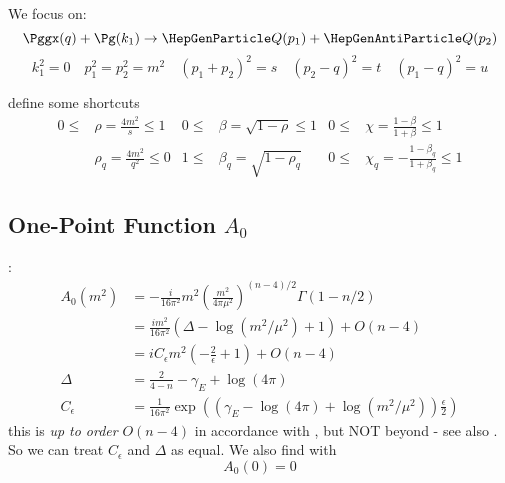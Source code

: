 We focus on:
\begin{equation}
\Pggx(q) + \Pg(k_1) \rightarrow \PQ(p_1)+\PaQ(p_2)
\end{equation}
\begin{equation}
k_1^2 = 0 \quad p_1^2 = p_2^2 = m^2 \quad (p_1+p_2)^2=s\quad (p_2-q)^2=t\quad (p_1-q)^2=u
\end{equation}

define some shortcuts
\begin{align}
0\leq&\rho = \frac {4m^2} s\leq 1 &0\leq&\beta = \sqrt{1-\rho}\leq 1 &0\leq&\chi = \frac{1-\beta}{1+\beta}\leq 1\\
&\rho_q = \frac {4m^2} {q^2}\leq 0 &1\leq&\beta_q = \sqrt{1-\rho_q} &0\leq&\chi_q = -\frac{1-\beta_q}{1+\beta_q}\leq 1
\end{align}

\subsection[One-Point Function A0]{One-Point Function $A_0$}
\cite{Denner:1991kt}:
\begin{align}
A_0(m^2)&=-\frac{i}{16\pi^2}m^2\left(\frac{m^2}{4\pi\mu^2}\right)^{(n-4)/2}\Gamma(1-n/2)\\
 &= \frac{im^2}{16\pi^2}\left(\Delta-\log(m^2/\mu^2)+1\right) + O(n-4)\\
 &= iC_\epsilon m^2 \left(-\frac 2 \epsilon+1\right) + O(n-4)\\
\Delta &= \frac 2 {4-n}-\gamma_E+\log(4\pi)\\
C_\epsilon &= \frac 1 {16\pi^2}\exp\left(\left(\gamma_E-\log(4\pi)+\log\left(m^2/\mu^2\right)\right)\frac{\epsilon} 2\right)
\end{align}
this is \textit{up to order} $O(n-4)$ in accordance with \cite{Bojak:2000eu}\cite{PhysRevD.40.54}, but NOT beyond - see also \cite[eq. (A.12)]{Bojak:2000eu}. So we can treat $C_\epsilon$ and $\Delta$ as equal. We also find with \cite{Bojak:2000eu}
\begin{equation}
A_0(0)=0
\end{equation}

